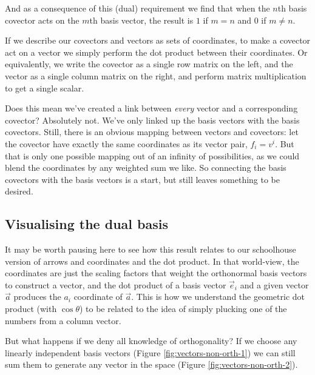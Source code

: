 And as a consequence of this (dual) requirement we find that when the $n$th basis covector acts on the $m$th basis vector, the result is $1$ if $m = n$ and $0$ if $m \ne n$.

If we describe our covectors and vectors as sets of coordinates, to make a covector act on a vector we simply perform the dot product between their coordinates. Or equivalently, we write the covector as a single row matrix on the left, and the vector as a single column matrix on the right, and perform matrix multiplication to get a single scalar.

Does this mean we've created a link between \textit{every} vector and a corresponding covector? Absolutely not. We've only linked up the basis vectors with the basis covectors. Still, there is an obvious mapping between vectors and covectors: let the covector have exactly the same coordinates as its vector pair, $f_i = v^i$. But that is only one possible mapping out of an infinity of possibilities, as we could blend the coordinates by any weighted sum we like. So connecting the basis covectors with the basis vectors is a start, but still leaves something to be desired.

\subsection{Visualising the dual basis}

It may be worth pausing here to see how this result relates to our schoolhouse version of arrows and coordinates and the dot product. In that world-view, the coordinates are just the scaling factors that weight the orthonormal basis vectors to construct a vector, and the dot product of a basis vector $\vec{e}_i$ and a given vector $\vec{a}$ produces the $a_i$ coordinate of $\vec{a}$. This is how we understand the geometric dot product (with $\cos \theta$) to be related to the idea of simply plucking one of the numbers from a column vector.

But what happens if we deny all knowledge of orthogonality? If we choose any linearly independent basis vectors (Figure \ref{fig:vectors-non-orth-1}) we can still sum them to generate any vector in the space (Figure \ref{fig:vectors-non-orth-2}).

